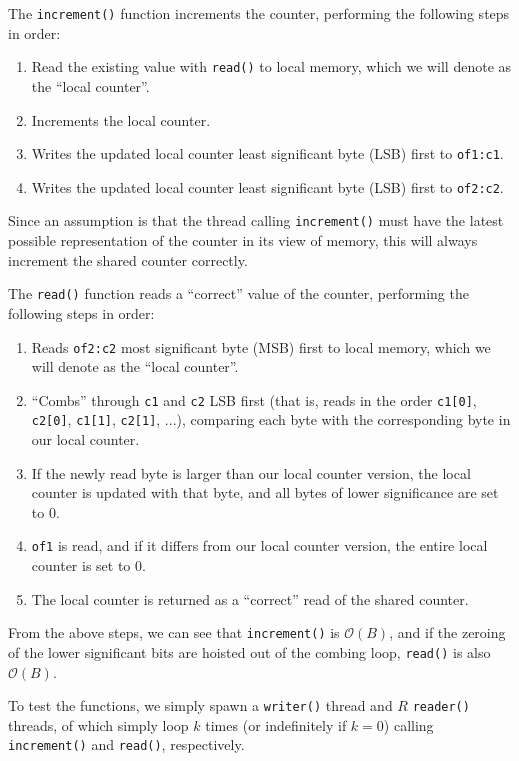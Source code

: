 \documentclass[a4paper]{scrartcl}
\begin{document}
The \texttt{increment()} function increments the counter, performing the following steps in order:
\begin{enumerate}
    \item Read the existing value with \texttt{read()} to local memory, which we will denote as the ``local counter''.
    \item Increments the local counter.
    \item Writes the updated local counter least significant byte (LSB) first to \texttt{of1:c1}.
    \item Writes the updated local counter least significant byte (LSB) first to \texttt{of2:c2}.
\end{enumerate}
Since an assumption is that the thread calling \texttt{increment()} must have the latest possible representation of the counter in its view of memory, this will always increment the shared counter correctly.

The \texttt{read()} function reads a ``correct'' value of the counter, performing the following steps in order:
\begin{enumerate}
    \item Reads \texttt{of2:c2} most significant byte (MSB) first to local memory, which we will denote as the ``local counter''.
    \item ``Combs'' through \texttt{c1} and \texttt{c2} LSB first (that is, reads in the order \texttt{c1[0]}, \texttt{c2[0]}, \texttt{c1[1]}, \texttt{c2[1]}, ...), comparing each byte with the corresponding byte in our local counter.
    \item If the newly read byte is larger than our local counter version, the local counter is updated with that byte, and all bytes of lower significance are set to 0.
    \item \texttt{of1} is read, and if it differs from our local counter version, the entire local counter is set to 0.
    \item The local counter is returned as a ``correct'' read of the shared counter.
\end{enumerate}

From the above steps, we can see that \texttt{increment()} is \(\mathcal{O}(B)\), and if the zeroing of the lower significant bits are hoisted out of the combing loop, \texttt{read()} is also \(\mathcal{O}(B)\).

To test the functions, we simply spawn a \texttt{writer()} thread and \(R\) \texttt{reader()} threads, of which simply loop \(k\) times (or indefinitely if \(k = 0\)) calling \texttt{increment()} and \texttt{read()}, respectively.
\end{document}
